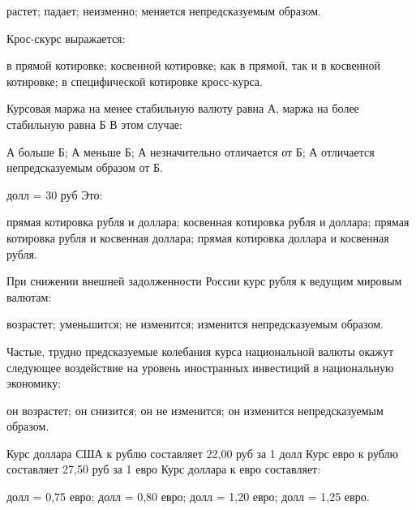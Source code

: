 \documentclass[12pt, table]{exam}
\begin{document}
\begin{questions}
\begin{multicols}{2}
\begin{choices}
	 \choice растет;
	 \choice падает;
	 \CC неизменно;
	 \choice меняется непредсказуемым образом.
	 \end{choices}
\question Крос-скурс выражается:
	 \begin{choices}
	 \choice в прямой котировке;
	 \CC косвенной котировке;
	 \choice как в прямой, так и в косвенной котировке;
	 \choice в специфической котировке кросс-курса.
	 \end{choices}
\question Курсовая маржа на менее стабильную валюту равна А, маржа на более стабильную равна Б В этом случае:
	 \begin{choices}
	 \choice А больше Б;
	 \choice А меньше Б;
	 \CC А незначительно отличается от Б;
	 \choice А отличается непредсказуемым образом от Б.
	 \end{choices}
 долл = 30 руб Это:
	 \begin{choices}
	 \choice прямая котировка рубля и доллара;
	 \CC косвенная котировка рубля и доллара;
	 \choice прямая котировка рубля и косвенная доллара;
	 \choice прямая котировка доллара и косвенная рубля.
	 \end{choices}
\question При снижении внешней задолженности России курс рубля к ведущим мировым валютам:
	 \begin{choices}
	 \choice возрастет;
	 \CC уменьшится;
	 \choice не изменится;
	 \choice изменится непредсказуемым образом.
	 \end{choices}
\question Частые, трудно предсказуемые колебания курса национальной валюты окажут следующее воздействие на уровень иностранных инвестиций в национальную экономику:
	 \begin{choices}
	 \CC он возрастет;
	 \choice он снизится;
	 \choice он не изменится;
	 \choice он изменится непредсказуемым образом.
	 \end{choices}
\question Курс доллара США к рублю составляет 22,00 руб за 1 долл Курс евро к рублю составляет 27,50 руб за 1 евро Курс доллара к евро составляет:
	 \begin{choices}
	  долл = 0,75 евро;
	  долл = 0,80 евро;
	  долл = 1,20 евро;
	  долл = 1,25 евро.
	 \end{choices}



\end{multicols}
\end{questions}
\end{document}
